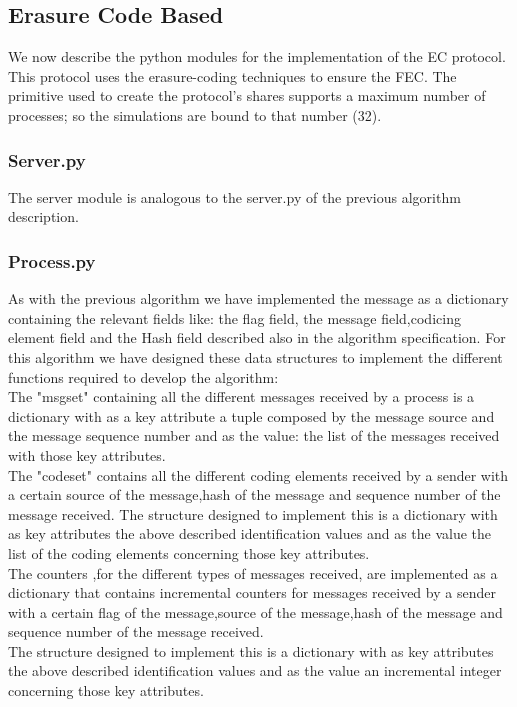 \documentclass[12pt]{article}
\begin{document}
\subsection{Erasure Code Based}
We now describe the python modules for the implementation of the EC protocol. This protocol uses the erasure-coding techniques to ensure the FEC. The primitive used to create the protocol's shares supports a maximum number of processes; so the simulations are bound to that number (32). \\
\subsubsection{Server.py}
The server module is analogous to the server.py of the previous algorithm description. \\
\subsubsection{Process.py}
As with the previous algorithm we have implemented the message as a dictionary containing the relevant fields like: the flag field, the message field,codicing element field and the Hash field described also in the algorithm specification. For this algorithm we have designed these data structures to implement the different functions required to develop the algorithm:\\
The "msgset" containing all the different messages received by a process is a dictionary with as a key attribute a tuple composed by the message source and the message sequence number and as the value: the list of the messages received with those key attributes.\\
The "codeset" contains all the different coding elements received by a sender with a certain source of the message,hash of the message and sequence number of the message received. The structure designed to implement this is a dictionary with as key attributes the above described identification values and as the value the list of the coding elements concerning those key attributes.\\
The counters ,for the different types of messages received, are implemented as a dictionary that contains incremental counters for messages received by a sender with a certain flag of the message,source of the message,hash of the message and sequence number of the message received.\\ The structure designed to implement this is a dictionary with as key attributes the above described identification values and as the value an incremental integer concerning those key attributes.
\end{document}
